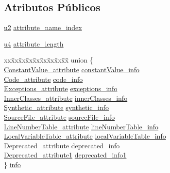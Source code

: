 \subsection*{Atributos Públicos}
\begin{DoxyCompactItemize}
\item 
\hyperlink{BasicTypes_8h_a732cde1300aafb73b0ea6c2558a7a54f}{u2} \hyperlink{structattribute__info_a19df9d4b42eb55ca5dc1bed98df89378}{attribute\+\_\+name\+\_\+index}
\item 
\hyperlink{BasicTypes_8h_ae5be1f726785414dd1b77d60df074c9d}{u4} \hyperlink{structattribute__info_a1ed8f679458c4bb0ed3315721588f50d}{attribute\+\_\+length}
\item 
\begin{tabbing}
xx\=xx\=xx\=xx\=xx\=xx\=xx\=xx\=xx\=\kill
union \{\\
\>\hyperlink{structConstantValue__attribute}{ConstantValue\_attribute} \hyperlink{structattribute__info_ae07b4986ad567ee03d7f5b9476cd2576}{constantValue\_info}\\
\>\hyperlink{structCode__attribute}{Code\_attribute} \hyperlink{structattribute__info_a098a24d1810b1a2a1691cbf89199bdc5}{code\_info}\\
\>\hyperlink{structExceptions__attribute}{Exceptions\_attribute} \hyperlink{structattribute__info_a244c271949354ebd402f9330cb02b062}{exceptions\_info}\\
\>\hyperlink{structInnerClasses__attribute}{InnerClasses\_attribute} \hyperlink{structattribute__info_ab17c5c178068ef13e7f6d61e741bc398}{innerClasses\_info}\\
\>\hyperlink{structSynthetic__attribute}{Synthetic\_attribute} \hyperlink{structattribute__info_a8a7080734144a95a2b2a0fc350fd235c}{synthetic\_info}\\
\>\hyperlink{structSourceFile__attribute}{SourceFile\_attribute} \hyperlink{structattribute__info_a92dad0fdd4730da884a5ee0f2fc181e7}{sourceFile\_info}\\
\>\hyperlink{structLineNumberTable__attribute}{LineNumberTable\_attribute} \hyperlink{structattribute__info_a184f00b0276336a22f3a41e55df6ecf9}{lineNumberTable\_info}\\
\>\hyperlink{structLocalVariableTable__attribute}{LocalVariableTable\_attribute} \hyperlink{structattribute__info_a98095c1c653f2dd7e6f11330967829e8}{localVariableTable\_info}\\
\>\hyperlink{structDeprecated__attribute}{Deprecated\_attribute} \hyperlink{structattribute__info_a915a26115aeeff5e3d997116f3d671ba}{deprecated\_info}\\
\>\hyperlink{structDeprecated__attribute1}{Deprecated\_attribute1} \hyperlink{structattribute__info_a5de1a193a4c37b0432092f204322dc46}{deprecated\_info1}\\
\} \hyperlink{structattribute__info_a5ce6e5e84e84941dfa2bab1322be6dcf}{info}\\

\end{tabbing}\end{DoxyCompactItemize}


